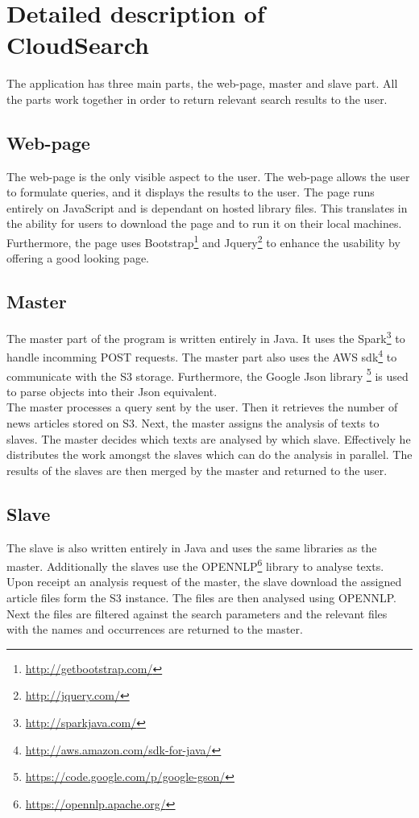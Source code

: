 \documentclass{acm_proc_article-sp}
\begin{document}
\appendix
\section{Detailed description of CloudSearch}
\label{app:detCS}
The application has three main parts, the web-page, master and slave part. 
All the parts work together in order to return relevant search results to the user.

\subsection{Web-page}
The web-page is the only visible aspect to the user.
The web-page allows the user to formulate queries, and it displays the results to the user.
The page runs entirely on JavaScript and is dependant on hosted library files.
This translates in the ability for users to download the page and to run it on their local machines.\\
Furthermore, the page uses Bootstrap\footnote{\url{http://getbootstrap.com/}} and Jquery\footnote{\url{http://jquery.com/}} to enhance the usability by offering a good looking page.

\subsection{Master}
The master part of the program is written entirely in Java.
It uses the Spark\footnote{\url{http://sparkjava.com/}} to handle incomming POST requests.
The master part also uses the AWS sdk\footnote{\url{http://aws.amazon.com/sdk-for-java/}} to communicate with the S3 storage.
Furthermore, the Google Json library \footnote{\url{https://code.google.com/p/google-gson/}} is used to parse objects into their Json equivalent.\\
The master processes a query sent by the user.
Then it retrieves the number of news articles stored on S3.
Next, the master assigns the analysis of texts to slaves.
The master decides which texts are analysed by which slave.
Effectively he distributes the work amongst the slaves which can do the analysis in parallel.
The results of the slaves are then merged by the master and returned to the user.

\subsection{Slave}
The slave is also written entirely in Java and uses the same libraries as the master.
Additionally the slaves use the OPENNLP\footnote{\url{https://opennlp.apache.org/}} library to analyse texts.\\
Upon receipt an analysis request of the master, the slave download the assigned article files form the S3 instance.
The files are then analysed using OPENNLP.
Next the files are filtered against the search parameters and the relevant files with the names and occurrences are returned to the master.
\end{document}
